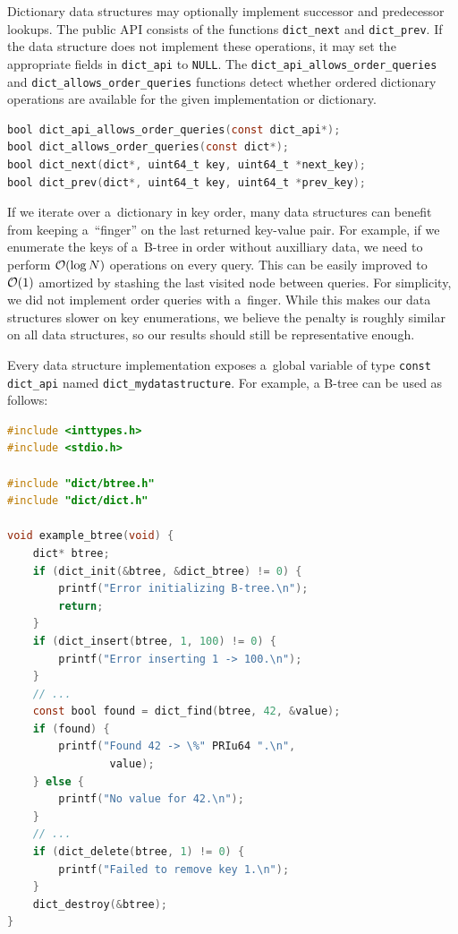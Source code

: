 Dictionary data structures may optionally implement successor and predecessor
lookups. The public API consists of the functions \texttt{dict\_next} and
\texttt{dict\_prev}. If the data structure does not implement these operations,
it may set the appropriate fields in \texttt{dict\_api} to \texttt{NULL}.
The \texttt{dict\_api\_allows\_order\_queries} and
\texttt{dict\_allows\_order\_queries} functions detect whether ordered
dictionary operations are available for the given implementation or dictionary.
\begin{lstlisting}[language=C]
bool dict_api_allows_order_queries(const dict_api*);
bool dict_allows_order_queries(const dict*);
bool dict_next(dict*, uint64_t key, uint64_t *next_key);
bool dict_prev(dict*, uint64_t key, uint64_t *prev_key);
\end{lstlisting}
If we iterate over a~dictionary in key order, many data structures can benefit
from keeping a~``finger'' on the last returned key-value pair. For example,
if we enumerate the keys of a~\mbox{B-tree} in order without auxilliary data,
we need to perform $\mathcal{O}(\log N)$ operations on every query. This can be easily
improved to $\mathcal{O}(1)$ amortized by stashing the last visited node between
queries. For simplicity, we did not implement order queries with a~finger.
While this makes our data structures slower on key enumerations, we believe
the penalty is roughly similar on all data structures, so our results should
still be representative enough.

Every data structure implementation exposes a~global variable of type
\texttt{const dict\_api} named \texttt{dict\_mydatastructure}. For example,
a B-tree can be used as follows:

\begin{lstlisting}[language=C]
#include <inttypes.h>
#include <stdio.h>

#include "dict/btree.h"
#include "dict/dict.h"

void example_btree(void) {
	dict* btree;
	if (dict_init(&btree, &dict_btree) != 0) {
		printf("Error initializing B-tree.\n");
		return;
	}
	if (dict_insert(btree, 1, 100) != 0) {
		printf("Error inserting 1 -> 100.\n");
	}
	// ...
	const bool found = dict_find(btree, 42, &value);
	if (found) {
		printf("Found 42 -> \%" PRIu64 ".\n",
				value);
	} else {
		printf("No value for 42.\n");
	}
	// ...
	if (dict_delete(btree, 1) != 0) {
		printf("Failed to remove key 1.\n");
	}
	dict_destroy(&btree);
}
\end{lstlisting}

